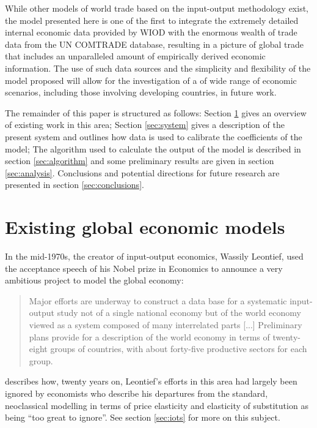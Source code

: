 \documentclass[a4paper]{article}
\begin{document}
While other models of world trade based on the input-output methodology exist, the model presented here is one of the first to integrate the extremely detailed internal economic data provided by WIOD with the enormous wealth of trade data from the UN COMTRADE database, resulting in a picture of global trade that includes an unparalleled amount of empirically derived economic information.
The use of such data sources and the simplicity and flexibility of the model proposed will allow for the investigation of a of wide range of economic scenarios, including those involving developing countries, in future work.

The remainder of this paper is structured as follows: 
Section \ref{sec:litreview} gives an overview of existing work in this area;
Section \ref{sec:system} gives a description of the present system and outlines how data is used to calibrate the coefficients of the model;
The algorithm used to calculate the output of the model is described in section \ref{sec:algorithm} and some preliminary results are given in section \ref{sec:analysis}.
Conclusions and potential directions for future research are presented in section \ref{sec:conclusions}.

\section{Existing global economic models} \label{sec:litreview}
In the mid-1970s, the creator of input-output economics, Wassily Leontief, used the acceptance speech of his Nobel prize in Economics to announce a very ambitious project to model the global economy:

\begin{quotation}
Major efforts are underway to construct a data base for a systematic input-output study not of a single national economy but of the world economy viewed as a system composed of many interrelated parts [...]
Preliminary plans provide for a description of the world economy in terms of twenty-eight groups of countries, with about forty-five productive sectors for each group. 
\end{quotation}

\textcite{duchin_international_2004} describes how, twenty years on, Leontief's efforts in this area had largely been ignored by economists who describe his departures from the standard, neoclassical modelling in terms of price elasticity and elasticity of substitution as being ``too great to ignore''. 
See section \ref{sec:iots} for more on this subject.
\end{document}
